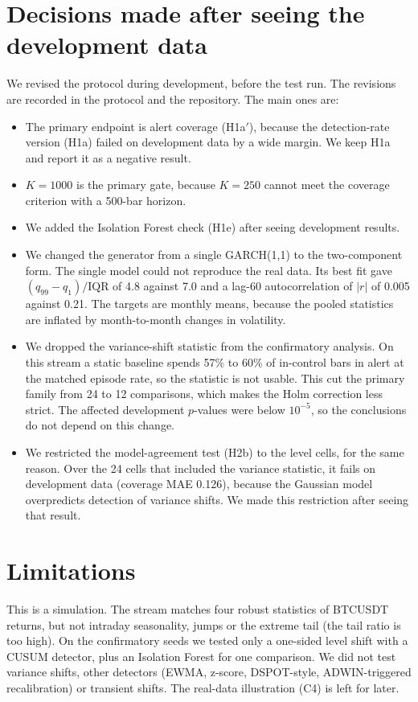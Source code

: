 \documentclass[11pt]{article}
\begin{document}
\section{Decisions made after seeing the development data}\label{sec:deviations}

We revised the protocol during development, before the test run. The revisions are recorded in the protocol and the repository. The main ones are:
\begin{itemize}
\item The primary endpoint is alert coverage (H1a$'$), because the detection-rate version (H1a) failed on development data by a wide margin. We keep H1a and report it as a negative result.
\item $K=1000$ is the primary gate, because $K=250$ cannot meet the coverage criterion with a 500-bar horizon.
\item We added the Isolation Forest check (H1e) after seeing development results.
\item We changed the generator from a single GARCH(1,1) to the two-component form. The single model could not reproduce the real data. Its best fit gave $(q_{99}-q_1)/\mathrm{IQR}$ of 4.8 against 7.0 and a lag-60 autocorrelation of $|r|$ of 0.005 against 0.21. The targets are monthly means, because the pooled statistics are inflated by month-to-month changes in volatility.
\item We dropped the variance-shift statistic from the confirmatory analysis. On this stream a static baseline spends 57\% to 60\% of in-control bars in alert at the matched episode rate, so the statistic is not usable. This cut the primary family from 24 to 12 comparisons, which makes the Holm correction less strict. The affected development $p$-values were below $10^{-5}$, so the conclusions do not depend on this change.
\item We restricted the model-agreement test (H2b) to the level cells, for the same reason. Over the 24 cells that included the variance statistic, it fails on development data (coverage MAE 0.126), because the Gaussian model overpredicts detection of variance shifts. We made this restriction after seeing that result.
\end{itemize}

\section{Limitations}

This is a simulation. The stream matches four robust statistics of BTCUSDT returns, but not intraday seasonality, jumps or the extreme tail (the tail ratio is too high). On the confirmatory seeds we tested only a one-sided level shift with a CUSUM detector, plus an Isolation Forest for one comparison. We did not test variance shifts, other detectors (EWMA, z-score, DSPOT-style, ADWIN-triggered recalibration) or transient shifts. The real-data illustration (C4) is left for later.
\end{document}

